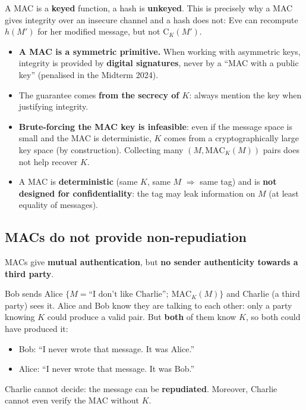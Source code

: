 \begin{remark}
A MAC is a \textbf{keyed} function, a hash is \textbf{unkeyed}. This is precisely why a MAC gives integrity over an insecure channel and a hash does not: Eve can recompute $h(M')$ for her modified message, but not $\mathrm{C}_K(M')$.
\end{remark}

\begin{remark}
\begin{itemize}
    \item \textbf{A MAC is a symmetric primitive.} When working with asymmetric keys, integrity is provided by \textbf{digital signatures}, never by a ``MAC with a public key'' (penalised in the Midterm 2024).
    \item The guarantee comes \textbf{from the secrecy of $K$}: always mention the key when justifying integrity.
    \item \textbf{Brute-forcing the MAC key is infeasible}: even if the message space is small and the MAC is deterministic, $K$ comes from a cryptographically large key space (by construction). Collecting many $(M, \mathrm{MAC}_K(M))$ pairs does not help recover $K$.
    \item A MAC is \textbf{deterministic} (same $K$, same $M$ $\Rightarrow$ same tag) and is \textbf{not designed for confidentiality}: the tag may leak information on $M$ (at least equality of messages).
\end{itemize}
\end{remark}

\subsection{MACs do not provide non-repudiation}

MACs give \textbf{mutual authentication}, but \textbf{no sender authenticity towards a third party}.

\begin{example}[Repudiation]
Bob sends Alice $\{M = \text{``I don't like Charlie''};\ \mathrm{MAC}_K(M)\}$ and Charlie (a third party) sees it. Alice and Bob know they are talking to each other: only a party knowing $K$ could produce a valid pair. But \textbf{both} of them know $K$, so both could have produced it:
\begin{itemize}
    \item Bob: ``I never wrote that message. It was Alice.''
    \item Alice: ``I never wrote that message. It was Bob.''
\end{itemize}
Charlie cannot decide: the message can be \textbf{repudiated}. Moreover, Charlie cannot even verify the MAC without $K$.
\end{example}

